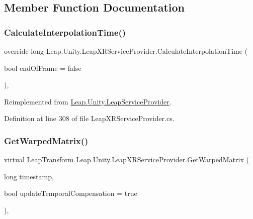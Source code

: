 \subsection{Member Function Documentation}
\mbox{\label{class_leap_1_1_unity_1_1_leap_x_r_service_provider_aafadeb0206fa3309e894ca7241535e81}} 
\subsubsection{\texorpdfstring{CalculateInterpolationTime()}{CalculateInterpolationTime()}}
{\footnotesize\ttfamily override long Leap.\+Unity.\+Leap\+X\+R\+Service\+Provider.\+Calculate\+Interpolation\+Time (\begin{DoxyParamCaption}\item[{bool}]{end\+Of\+Frame = {\ttfamily false} }\end{DoxyParamCaption})\hspace{0.3cm}{\ttfamily [protected]}, {\ttfamily [virtual]}}



Reimplemented from \mbox{\hyperlink{class_leap_1_1_unity_1_1_leap_service_provider_a54a106ef4054e95402df75c45a7bc321}{Leap.\+Unity.\+Leap\+Service\+Provider}}.



Definition at line 308 of file Leap\+X\+R\+Service\+Provider.\+cs.

\mbox{\label{class_leap_1_1_unity_1_1_leap_x_r_service_provider_a5a7dd26c6fcf64f5bd085be124fd69ed}} 
\subsubsection{\texorpdfstring{GetWarpedMatrix()}{GetWarpedMatrix()}}
{\footnotesize\ttfamily virtual \mbox{\hyperlink{struct_leap_1_1_leap_transform}{Leap\+Transform}} Leap.\+Unity.\+Leap\+X\+R\+Service\+Provider.\+Get\+Warped\+Matrix (\begin{DoxyParamCaption}\item[{long}]{timestamp,  }\item[{bool}]{update\+Temporal\+Compensation = {\ttfamily true} }\end{DoxyParamCaption})\hspace{0.3cm}{\ttfamily [protected]}, {\ttfamily [virtual]}}



